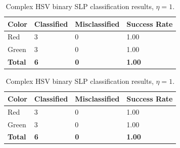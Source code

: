 \documentclass[twoside]{IEEEtran}
\begin{document}
\begin{table}[!b]
    \centering

    \begin{minipage}{\columnwidth}
        \centering
        \caption{RGB binary SLP classification results, \( \eta = 1 \).}%
        \label{rgb_binary_slp}
        \begin{tabular}{ l l l l }
            \toprule
            \bfseries Color & \bfseries Classified & \bfseries Misclassified & \bfseries Success Rate \\
            \midrule
            Red             & 3                    & 0                       & 1.00                   \\
            Green           & 3                    & 0                       & 1.00                   \\
            \midrule
            \bfseries Total & \bfseries 6          & \bfseries 0             & \bfseries 1.00         \\
            \bottomrule
        \end{tabular}
    \end{minipage}%
    \begin{minipage}{\columnwidth}
        \centering
        \caption{Complex HSV binary SLP classification results, \( \eta = 1 \).}%
        \label{hsv_binary_slp}
        \begin{tabular}{ l l l l }
            \toprule
            \bfseries Color & \bfseries Classified & \bfseries Misclassified & \bfseries Success Rate \\
            \midrule
            Red             & 3                    & 0                       & 1.00                   \\
            Green           & 3                    & 0                       & 1.00                   \\
            \midrule
            \bfseries Total & \bfseries 6          & \bfseries 0             & \bfseries 1.00         \\
            \bottomrule
        \end{tabular}
    \end{minipage}
\end{table}
\end{document}
